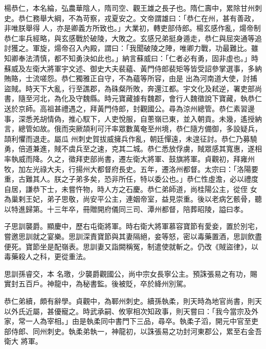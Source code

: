 \begin{pinyinscope}
 楊恭仁，本名綸，弘農華陰人，隋司空、觀王雄之長子也。隋仁壽中，累除甘州刺史。恭仁務舉大綱，不為苛察，戎夏安之。文帝謂雄曰：「恭仁在州，甚有善政，非唯朕舉得
 人，亦是卿義方所致也。」大業初，轉吏部侍郎。楊玄感作亂，煬帝制恭仁率兵經略，與玄感戰於破陵，大敗之。玄感兄弟挺身遁走，恭仁與屈突通等追討獲之。軍旋，煬帝召入內殿，謂曰：「我聞破陵之陣，唯卿力戰，功最難比。雖知卿奉法清慎，都不知勇決如此也。」納言蘇威曰：「仁者必有勇，固非虛也。」時蘇威及左衛大將軍宇文述、御史大夫裴蘊、黃門侍郎裴矩等皆受詔參掌選事，多納賄賂，士流嗟怨。恭仁獨雅正自守，不為蘊等所容，由是
 出為河南道大使，討捕盜賊。時天下大亂，行至譙郡，為硃粲所敗，奔還江都。宇文化及弒逆，署吏部尚書，隨至河北，為化及守魏縣。時元寶藏據有魏郡，會行人魏徵說下寶藏，執恭仁送於京師。高祖甚禮遇之，拜黃門侍郎，封觀國公。尋為涼州總管。恭仁素習邊事，深悉羌胡情偽，推心馭下，人吏悅服，自蔥嶺已東，並入朝貢。未幾，遙授納言，總管如故。俄而突厥頡利可汗率眾數萬奄至州境，恭仁隨方備御，多設疑兵，頡利懼而退走。屬瓜
 州刺史賀拔威擁兵作亂，朝廷憚遠，未遑征討。恭仁乃募驍勇，倍道兼進，賊不虞兵至之速，克其二城。恭仁悉放俘虜，賊眾感其寬惠，遂相率執威而降。久之，徵拜吏部尚書，遷左衛大將軍、鼓旗將軍。貞觀初，拜雍州牧，加左光祿大夫，行揚州大都督府長史。五年，遷洛州都督。太宗曰：「洛陽要重，古難其人。朕之子弟多矣，恐非所任，特以委公也。」恭仁性虛澹，必以禮度自居，謙恭下士，未嘗忤物，時人方之石慶。恭仁弟師道，尚桂陽公主，從侄
 女為巢剌王妃，弟子思敬，尚安平公主，連姻帝室，益見崇重。後以老病乞骸骨，聽以特進歸第。十三年卒，冊贈開府儀同三司、潭州都督，陪葬昭陵，謚曰孝。



 子思訓襲爵。顯慶中，歷右屯衛將軍。時右衛大將軍慕容寶節有愛妾，置於別宅，嘗邀思訓就之宴樂。思訓深責寶節與其妻隔絕，妾等怒，密以毒藥置酒，思訓飲盡便死。寶節坐是配嶺表。思訓妻又詣闕稱冤，制遣使就斬之。仍改《賊盜律》，以毒藥殺人之科，更從重法。



 思訓孫睿交，本
 名璬，少襲爵觀國公，尚中宗女長寧公主。預誅張易之有功，賜實封五百戶。神龍中，為秘書監。後被貶，卒於絳州別駕。



 恭仁弟續，頗有辭學。貞觀中，為鄆州刺史。續孫執柔，則天時為地官尚書，則天以外氏近屬，甚優寵之。時武承嗣、攸寧相次知政事，則天嘗曰：「我今當宗及外家，常一人為宰相。」由是執柔同中書門下三品，尋卒。執柔子滔，開元中官至吏部侍郎、同州刺史。執柔弟執一，神龍初，以誅張易之功封河東郡公，累至右金吾衛大
 將軍。




\end{pinyinscope}
